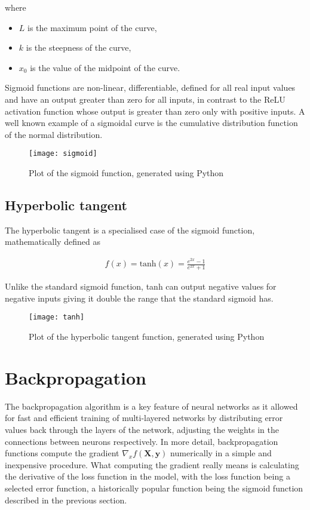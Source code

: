 where 
\begin{itemize}[nosep]
    \item[] $L$ is the maximum point of the curve,
    \item[] $k$ is the steepness of the curve,
    \item[] $x_0$ is the value of the midpoint of the curve. 
\end{itemize}

Sigmoid functions are non-linear, differentiable, defined for all real input values and have an output greater than zero for all inputs, in contrast to the ReLU activation function whose output is greater than zero only with positive inputs. A well known example of a sigmoidal curve is the cumulative distribution function of the normal distribution.

\begin{figure}[H]
    \centering
    \texttt{[image: sigmoid]}
    \caption{Plot of the sigmoid function, generated using Python}
    \label{tab:sigmoid}
\end{figure}

\subsection{Hyperbolic tangent}
The hyperbolic tangent is a specialised case of the sigmoid function, mathematically defined as 

\begin{align}
    f(x) = \text{tanh}(x) = \frac{e^{2x} - 1}{e^{2x} + 1}
\end{align}

Unlike the standard sigmoid function, tanh can output negative values for negative inputs giving it double the range that the standard sigmoid has.

\begin{figure}[H]
    \centering
    \texttt{[image: tanh]}
    \caption{Plot of the hyperbolic tangent function, generated using Python}
    \label{tab:tanh}
\end{figure}

\section{Backpropagation}
The backpropagation algorithm is a key feature of neural networks as it allowed for fast and efficient training of multi-layered networks by distributing error values back through the layers of the network, adjusting the weights in the connections between neurons respectively. In more detail, backpropagation functions compute the gradient $\nabla_{x}f(\mathbf{X}, \mathbf{y})$ numerically in a simple and inexpensive procedure. What computing the gradient really means is calculating the derivative of the loss function in the model, with the loss function being a selected error function, a historically popular function being the sigmoid function described in the previous section.

